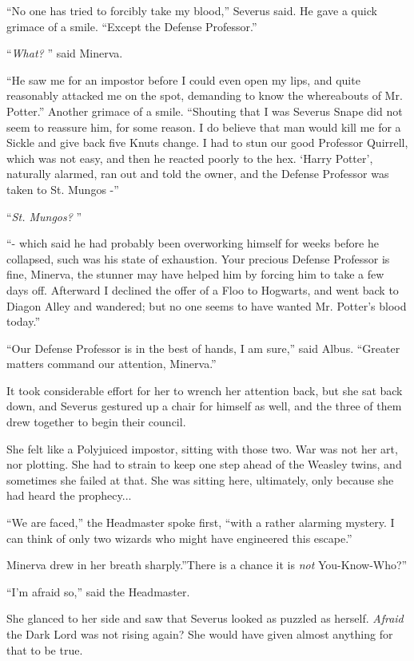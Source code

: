 ``No one has tried to forcibly take my blood,'' Severus said. He gave a
quick grimace of a smile. ``Except the Defense Professor.''

``\emph{What?} '' said Minerva.

``He saw me for an impostor before I could even open my lips, and quite
reasonably attacked me on the spot, demanding to know the whereabouts of
Mr. Potter.'' Another grimace of a smile. ``Shouting that I was Severus
Snape did not seem to reassure him, for some reason. I do believe that
man would kill me for a Sickle and give back five Knuts change. I had to
stun our good Professor Quirrell, which was not easy, and then he
reacted poorly to the hex. `Harry Potter', naturally alarmed, ran out
and told the owner, and the Defense Professor was taken to St. Mungos
-''

``\emph{St. Mungos?} ''

``- which said he had probably been overworking himself for weeks before
he collapsed, such was his state of exhaustion. Your precious Defense
Professor is fine, Minerva, the stunner may have helped him by forcing
him to take a few days off. Afterward I declined the offer of a Floo to
Hogwarts, and went back to Diagon Alley and wandered; but no one seems
to have wanted Mr. Potter's blood today.''

``Our Defense Professor is in the best of hands, I am sure,'' said
Albus. ``Greater matters command our attention, Minerva.''

It took considerable effort for her to wrench her attention back, but
she sat back down, and Severus gestured up a chair for himself as well,
and the three of them drew together to begin their council.

She felt like a Polyjuiced impostor, sitting with those two. War was not
her art, nor plotting. She had to strain to keep one step ahead of the
Weasley twins, and sometimes she failed at that. She was sitting here,
ultimately, only because she had heard the prophecy...

``We are faced,'' the Headmaster spoke first, ``with a rather alarming
mystery. I can think of only two wizards who might have engineered this
escape.''

Minerva drew in her breath sharply.''There is a chance it is \emph{not}
You-Know-Who?''

``I'm afraid so,'' said the Headmaster.

She glanced to her side and saw that Severus looked as puzzled as
herself. \emph{Afraid} the Dark Lord was not rising again? She would
have given almost anything for that to be true.

